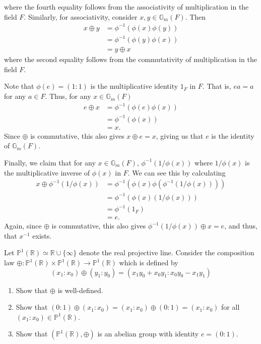 \documentclass[12 pt, letterpaper]{hmcpset}
\begin{document}
\begin{solution}
	where the fourth equality follows from the associativity of multiplication in the field $F$. Similarly, for associativity, consider $x, y \in \mathbb{G}_{m}(F)$. Then
	\[
		\begin{split}
			x \oplus y & = \phi^{-1}(\phi(x) \phi(y)) \\
				   & = \phi^{-1}(\phi(y) \phi(x)) \\
				   & = y \oplus x
		\end{split}
	\]
	where the second equality follows from the commutativity of multiplication in the field $F$.

	Note that $\phi(e) = (1 : 1)$ is the multiplicative identity $1_{F}$ in $F$. That is, $e a = a$ for any $a \in F$. Thus, for any $x \in \mathbb{G}_{m}(F)$
	\[
		\begin{split}
			e \oplus x & = \phi^{-1}(\phi(e) \phi(x)) \\
				   & = \phi^{-1}(\phi(x)) \\
				   & = x.
		\end{split}
	\]
	Since $\oplus$ is commutative, this also gives $x \oplus e = x$, giving us that $e$ is the identity of $\mathbb{G}_{m}(F)$.

	Finally, we claim that for any $x \in \mathbb{G}_{m}(F)$, $\phi^{-1}(1 / \phi(x))$ where $1 / \phi(x)$ is the multiplicative inverse of $\phi(x)$ in $F$. We can see this by calculating
	\[
		\begin{split}
			x \oplus \phi^{-1}(1 / \phi(x)) & = \phi^{-1}(\phi(x) \phi(\phi^{-1}(1 / \phi(x)))) \\
							& = \phi^{-1}(\phi(x) (1 / \phi(x))) \\
							& = \phi^{-1}(1_{F}) \\
							& = e.
		\end{split}
	\]
	Again, since $\oplus$ is commutative, this also gives $\phi^{-1}(1 / \phi(x)) \oplus x = e$, and thus, that $x^{-1}$ exists.
\end{solution}

\pagebreak

\begin{problem}[Problem 2.]
	Let $\mathbb{P}^{1}(\mathbb{R}) \simeq \mathbb{R} \cup \{ \infty \}$ denote the real projective line. Consider the composition law $\oplus : \mathbb{P}^{1}(\mathbb{R}) \times \mathbb{P}^{1}(\mathbb{R}) \to \mathbb{P}^{1}(\mathbb{R})$ which is defined by
	\[
		(x_{1} : x_{0}) \oplus (y_{1} : y_{0}) = (x_{1} y_{0} + x_{0} y_{1} : x_{0} y_{0} - x_{1} y_{1})
	\]
	\begin{enumerate}
		\item Show that $\oplus$ is well-defined.
		\item Show that $(0: 1) \oplus (x_{1} : x_{0}) = (x_{1} : x_{0}) \oplus (0 : 1) = (x_{1} : x_{0})$ for all $(x_{1} : x_{0}) \in \mathbb{P}^{1}(\mathbb{R})$.
		\item Show that $(\mathbb{P}^{1}(\mathbb{R}), \oplus)$ is an abelian group with identity $e = (0 : 1)$.
	\end{enumerate}
\end{problem}
\end{document}

